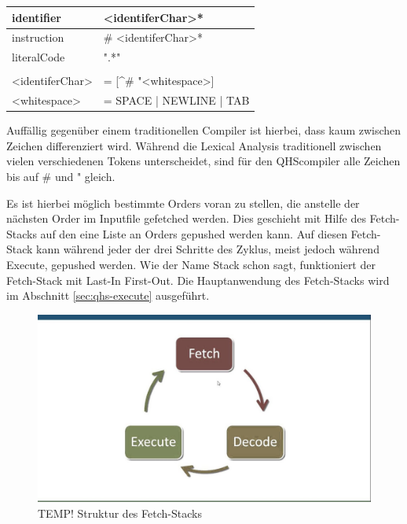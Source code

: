 \begin{table}[h]
    \centering
    \begin{tabular}{ll}
    \multicolumn{1}{l|}{identifier}        & \textless{}identiferChar\textgreater{}*                           \\ \hline
    \multicolumn{1}{l|}{instruction}       & \# \textless{}identiferChar\textgreater{}*                        \\ \hline
    \multicolumn{1}{l|}{literalCode}       & ".*"                                                              \\
                                           &                                                                   \\
    \textless{}identiferChar\textgreater{} & = {[}\textasciicircum{}\# "\textless{}whitespace\textgreater{}{]} \\
    \textless{}whitespace\textgreater{}    & = SPACE | NEWLINE | TAB
    
    \end{tabular}
\end{table}

Auffällig gegenüber einem traditionellen Compiler ist hierbei, dass kaum zwischen Zeichen differenziert wird. Während die Lexical Analysis traditionell zwischen vielen verschiedenen Tokens unterscheidet,
sind für den QHScompiler alle Zeichen bis auf \# und " gleich.

Es ist hierbei möglich bestimmte Orders voran zu stellen, die anstelle der nächsten Order im Inputfile gefetched werden. Dies geschieht mit Hilfe des Fetch-Stacks auf den eine Liste an Orders gepushed werden kann.
Auf diesen Fetch-Stack kann während jeder der drei Schritte des Zyklus, meist jedoch während Execute, gepushed werden. Wie der Name Stack schon sagt, funktioniert der Fetch-Stack mit Last-In First-Out.
Die Hauptanwendung des Fetch-Stacks wird im Abschnitt \ref{sec:qhs-execute} ausgeführt.

\begin{figure}[h!]
    \centering
    \includegraphics[scale=0.3]{resources/TEMP_von-neumann-cycle.jpg}
    \caption{TEMP! Struktur des Fetch-Stacks}
    \label{fig:fetch-stack}
\end{figure}

